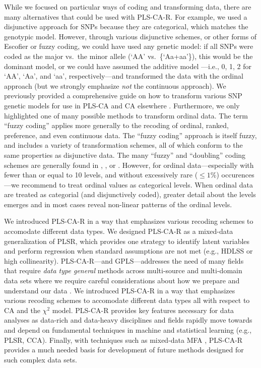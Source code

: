 \documentclass[12pt]{article}
\begin{document}
While we focused on particular ways of coding and transforming data,
there are many alternatives that could be used with PLS-CA-R. For
example, we used a disjunctive approach for SNPs because they are
categorical, which matches the genotypic model. However, through various
disjunctive schemes, or other forms of Escofier or fuzzy coding, we
could have used any genetic model: if all SNPs were coded as the major
vs.~the minor allele (`AA' vs.~\{`Aa+aa'\}), this would be the dominant
model, or we could have assumed the additive model ---i.e., 0, 1, 2 for
`AA', `Aa', and `aa', respectively---and transformed the data with the
ordinal approach (but we strongly emphasize \emph{not} the continuous
approach). We previously provided a comprehensive guide on how to
transform various SNP genetic models for use in PLS-CA and CA elsewhere
\citep[see Appendix of][]{beaton_partial_2016}. Furthermore, we only
highlighted one of many possible methods to transform ordinal data. The
term ``fuzzy coding'' applies more generally to the recoding of ordinal,
ranked, preference, and even continuous data. The ``fuzzy coding''
approach is itself fuzzy, and includes a variety of transformation
schemes, all of which conform to the same properties as disjunctive
data. The many ``fuzzy'' and ``doubling'' coding schemes are generally
found in \citet{escofier_traitement_1979},
\citet{lebart_multivariate_1984}, or \citet{greenacrefuzzy}. However,
for ordinal data---especially with fewer than or equal to 10 levels, and
without excessively rare (\(\leq 1\)\%) occurences---we recommend to
treat ordinal values as categorical levels. When ordinal data are
treated as categorial (and disjunctively coded), greater detail about
the levels emerges and in most cases reveal non-linear patterns of the
ordinal levels.

We introduced PLS-CA-R in a way that emphasizes various recoding schemes
to accomodate different data types. We designed PLS-CA-R as a mixed-data
generalization of PLSR, which provides one strategy to identify latent
variables and perform regression when standard assumptions are not met
(e.g., HDLSS or high collinearity). PLS-CA-R---and GPLS---addresses the
need of many fields that require \textit{data type general} methods
across multi-source and multi-domain data sets where we require careful
considerations about how we prepare and understand our data
\citep{nguyen2019ten}. We introduced PLS-CA-R in a way that emphasizes
various recoding schemes to accomodate different data types all with
respect to CA and the \(\chi^2\) model. PLS-CA-R provides key features
necessary for data analyses as data-rich and data-heavy disciplines and
fields rapidly move towards and depend on fundamental techniques in
machine and statistical learning (e.g., PLSR, CCA). Finally, with
techniques such as mixed-data MFA \citep{becue-bertaut_multiple_2008},
PLS-CA-R provides a much needed basis for development of future methods
designed for such complex data sets.
\end{document}
